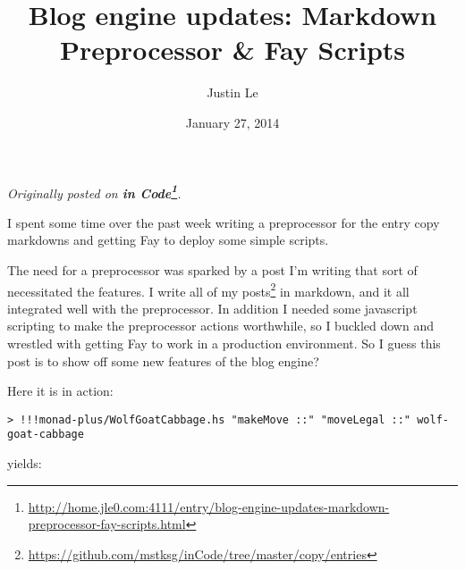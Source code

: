 \documentclass[]{article}
\title{Blog engine updates: Markdown Preprocessor \& Fay Scripts}
\author{Justin Le}
\date{January 27, 2014}
\newenvironment{Shaded}{}{}
\newcommand{\KeywordTok}[1]{\textcolor[rgb]{0.00,0.44,0.13}{\textbf{{#1}}}}
\newcommand{\DataTypeTok}[1]{\textcolor[rgb]{0.56,0.13,0.00}{{#1}}}
\newcommand{\CommentTok}[1]{\textcolor[rgb]{0.38,0.63,0.69}{\textit{{#1}}}}
\newcommand{\OtherTok}[1]{\textcolor[rgb]{0.00,0.44,0.13}{{#1}}}
\newcommand{\FunctionTok}[1]{\textcolor[rgb]{0.02,0.16,0.49}{{#1}}}
\newcommand{\NormalTok}[1]{{#1}}
\renewcommand{\href}[2]{#2\footnote{\url{#1}}}
\begin{document}
\maketitle

\emph{Originally posted on
\textbf{\href{http://home.jle0.com:4111/entry/blog-engine-updates-markdown-preprocessor-fay-scripts.html}{in
Code}}.}

I spent some time over the past week writing a preprocessor for the entry copy markdowns and getting
Fay to deploy some simple scripts.

The need for a preprocessor was sparked by a post I'm writing that sort of necessitated the
features. I write \href{https://github.com/mstksg/inCode/tree/master/copy/entries}{all of my posts}
in markdown, and it all integrated well with the preprocessor. In addition I needed some javascript
scripting to make the preprocessor actions worthwhile, so I buckled down and wrestled with getting
Fay to work in a production environment. So I guess this post is to show off some new features of
the blog engine?

Here it is in action:

\begin{verbatim}
> !!!monad-plus/WolfGoatCabbage.hs "makeMove ::" "moveLegal ::" wolf-goat-cabbage
\end{verbatim}

yields:

\begin{Shaded}
\end{Shaded}
\end{document}
